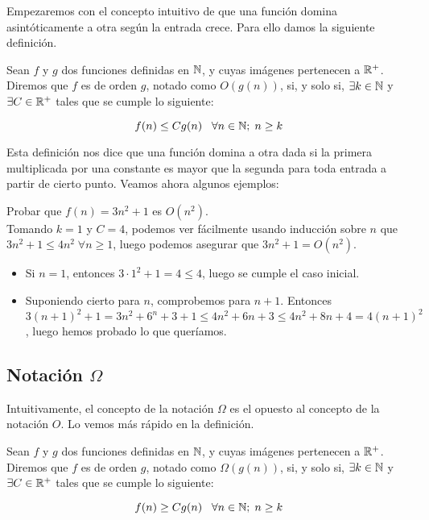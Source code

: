 Empezaremos con el concepto intuitivo de que una función domina asintóticamente a otra según la entrada crece. Para ello damos la siguiente definición.

\begin{definicion}
	Sean $f$ y $g$ dos funciones definidas en $\mathbb{N}$, y cuyas imágenes pertenecen a $\mathbb{R}^+$. Diremos que $f$ es de orden $g$, notado como $O(g(n))$, si, y solo si, $\exists k \in \mathbb{N}$ y $\exists C \in \mathbb{R}^+$ tales que se cumple lo siguiente:
	
	$$f(n) \leq Cg(n) \;\;\;\forall n \in \mathbb{N};\; n \geq k$$
\end{definicion}

Esta definición nos dice que una función domina a otra dada si la primera multiplicada por una constante es mayor que la segunda para toda entrada a partir de cierto punto. Veamos ahora algunos ejemplos:

\begin{ejemplo}
	Probar que $f(n) = 3n^2 + 1$ es $O(n^2)$.\\
	
	Tomando $k=1$ y $C=4$, podemos ver fácilmente usando inducción sobre $n$ que $3n^2 + 1 \leq 4n^2\;\forall n \geq 1$, luego podemos asegurar que $3n^2 + 1 = O(n^2)$.\\
	
	\begin{itemize}
		\item Si $n=1$, entonces $3 \cdot 1^2 + 1 = 4 \leq 4$, luego se cumple el caso inicial.
		\item Suponiendo cierto para $n$, comprobemos para $n + 1$. Entonces $3(n+1)^2 + 1 = 3n^2 + 6^n + 3 + 1 \leq 4n^2 + 6n + 3 \leq 4n^2 + 8n + 4 = 4(n+1)^2$, luego hemos probado lo que queríamos.
	\end{itemize}
\end{ejemplo}

\subsection{Notación $\Omega$}

Intuitivamente, el concepto de la notación $\Omega$ es el opuesto al concepto de la notación $O$. Lo vemos más rápido en la definición.

\begin{definicion}
	Sean $f$ y $g$ dos funciones definidas en $\mathbb{N}$, y cuyas imágenes pertenecen a $\mathbb{R}^+$. Diremos que $f$ es de orden $g$, notado como $\Omega(g(n))$, si, y solo si, $\exists k \in \mathbb{N}$ y $\exists C \in \mathbb{R}^+$ tales que se cumple lo siguiente:
	
	$$f(n) \geq Cg(n) \;\;\;\forall n \in \mathbb{N};\; n \geq k$$
\end{definicion}

